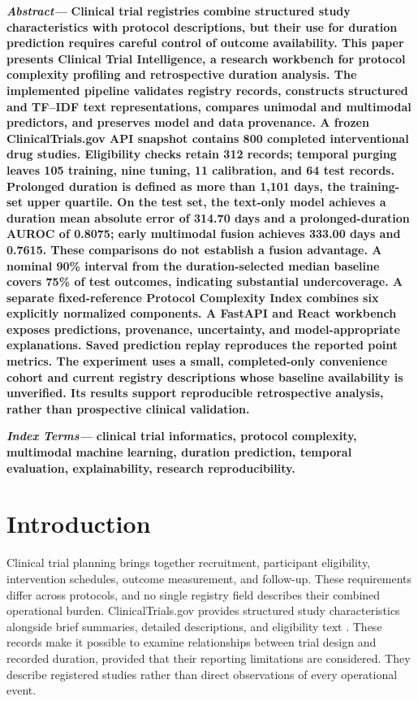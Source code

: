 \documentclass[10pt,letterpaper,twocolumn]{article}
\begin{document}
\noindent
{\bfseries\itshape Abstract—}
{\bfseries
Clinical trial registries combine structured study characteristics with protocol descriptions, but their use for duration prediction requires careful control of outcome availability. This paper presents Clinical Trial Intelligence, a research workbench for protocol complexity profiling and retrospective duration analysis. The implemented pipeline validates registry records, constructs structured and TF--IDF text representations, compares unimodal and multimodal predictors, and preserves model and data provenance. A frozen ClinicalTrials.gov API snapshot contains 800 completed interventional drug studies. Eligibility checks retain 312 records; temporal purging leaves 105 training, nine tuning, 11 calibration, and 64 test records. Prolonged duration is defined as more than 1,101 days, the training-set upper quartile. On the test set, the text-only model achieves a duration mean absolute error of 314.70 days and a prolonged-duration AUROC of 0.8075; early multimodal fusion achieves 333.00 days and 0.7615. These comparisons do not establish a fusion advantage. A nominal 90\% interval from the duration-selected median baseline covers 75\% of test outcomes, indicating substantial undercoverage. A separate fixed-reference Protocol Complexity Index combines six explicitly normalized components. A FastAPI and React workbench exposes predictions, provenance, uncertainty, and model-appropriate explanations. Saved prediction replay reproduces the reported point metrics. The experiment uses a small, completed-only convenience cohort and current registry descriptions whose baseline availability is unverified. Its results support reproducible retrospective analysis, rather than prospective clinical validation.
}

\vspace{2pt}

\noindent
{\bfseries\itshape Index Terms—}
{\bfseries clinical trial informatics, protocol complexity, multimodal machine learning, duration prediction, temporal evaluation, explainability, research reproducibility.}

\vspace{8pt}

\section{Introduction}

Clinical trial planning brings together recruitment, participant eligibility, intervention schedules, outcome measurement, and follow-up. These requirements differ across protocols, and no single registry field describes their combined operational burden. ClinicalTrials.gov provides structured study characteristics alongside brief summaries, detailed descriptions, and eligibility text \cite{clinicaltrials}. These records make it possible to examine relationships between trial design and recorded duration, provided that their reporting limitations are considered. They describe registered studies rather than direct observations of every operational event.
\end{document}
